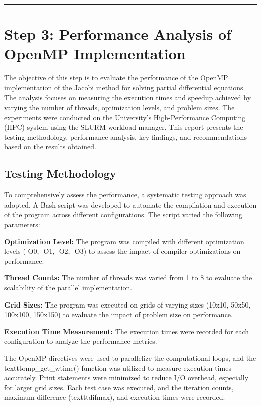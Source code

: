 \documentclass{article}
\begin{document}
\rule{\linewidth}{0.5pt}
\newpage

\section{Step 3: Performance Analysis of OpenMP Implementation}

The objective of this step is to evaluate the performance of the OpenMP implementation of the Jacobi method for solving partial differential equations. The analysis focuses on measuring the execution times and speedup achieved by varying the number of threads, optimization levels, and problem sizes. The experiments were conducted on the University's High-Performance Computing (HPC) system using the SLURM workload manager. This report presents the testing methodology, performance analysis, key findings, and recommendations based on the results obtained.

\subsection{Testing Methodology}

To comprehensively assess the performance, a systematic testing approach was adopted. A Bash script was developed to automate the compilation and execution of the program across different configurations. The script varied the following parameters:


\textbf{Optimization Level:} The program was compiled with different optimization levels (-O0, -O1, -O2, -O3) to assess the impact of compiler optimizations on performance.

\textbf{Thread Counts:} The number of threads was varied from 1 to 8 to evaluate the scalability of the parallel implementation.

\textbf{Grid Sizes:} The program was executed on grids of varying sizes (10x10, 50x50, 100x100, 150x150) to evaluate the impact of problem size on performance.

\textbf{Execution Time Measurement:} The execution times were recorded for each configuration to analyze the performance metrics.

The OpenMP directives were used to parallelize the computational loops, and the texttt{omp\_get\_wtime()} function was utilized to measure execution times accurately. Print statements were minimized to reduce I/O overhead, especially for larger grid sizes. Each test case was executed, and the iteration counts, maximum difference (texttt{difmax}), and execution times were recorded.
\end{document}
